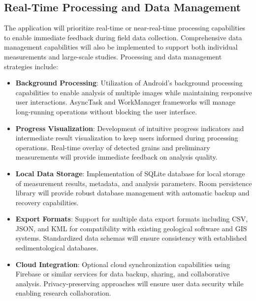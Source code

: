 \documentclass[project-plan]{report-template}
\begin{document}
\subsection{Real-Time Processing and Data Management}
The application will prioritize real-time or near-real-time processing capabilities to enable immediate feedback during field data collection. Comprehensive data management capabilities will also be implemented to support both individual measurements and large-scale studies. Processing and data management strategies include:
\begin{itemize}
    \item \textbf{Background Processing}: Utilization of Android's background processing capabilities to enable analysis of multiple images while maintaining responsive user interactions. AsyncTask and WorkManager frameworks will manage long-running operations without blocking the user interface.
\end{itemize}
\begin{itemize}
    \item \textbf{Progress Visualization}: Development of intuitive progress indicators and intermediate result visualization to keep users informed during processing operations. Real-time overlay of detected grains and preliminary measurements will provide immediate feedback on analysis quality.
\end{itemize}
\begin{itemize}
    \item \textbf{Local Data Storage}: Implementation of SQLite database for local storage of measurement results, metadata, and analysis parameters. Room persistence library will provide robust database management with automatic backup and recovery capabilities.
\end{itemize}
\begin{itemize}
    \item \textbf{Export Formats}: Support for multiple data export formats including CSV, JSON, and KML for compatibility with existing geological software and GIS systems. Standardized data schemas will ensure consistency with established sedimentological databases.
\end{itemize}
\begin{itemize}
    \item \textbf{Cloud Integration}: Optional cloud synchronization capabilities using Firebase or similar services for data backup, sharing, and collaborative analysis. Privacy-preserving approaches will ensure user data security while enabling research collaboration.
\end{itemize}
\end{document}
